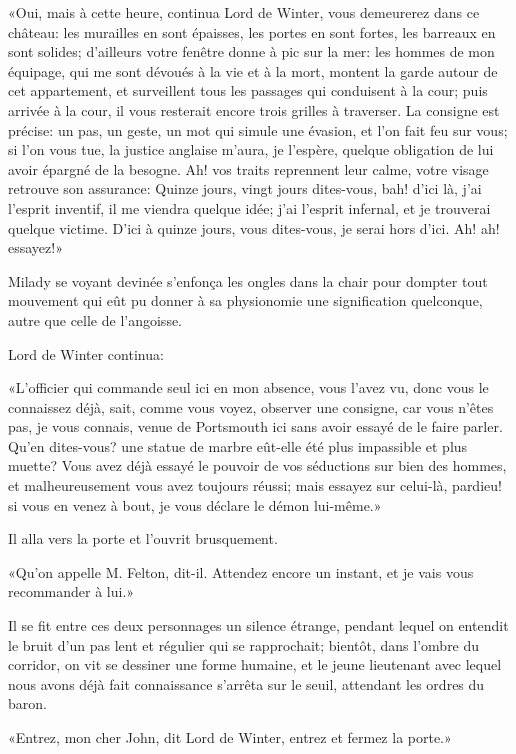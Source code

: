 «Oui, mais à cette heure, continua Lord de Winter, vous demeurerez dans ce château: les murailles en sont épaisses, les portes en sont fortes, les barreaux en sont solides; d'ailleurs votre fenêtre donne à pic sur la mer: les hommes de mon équipage, qui me sont dévoués à la vie et à la mort, montent la garde autour de cet appartement, et surveillent tous les passages qui conduisent à la cour; puis arrivée à la cour, il vous resterait encore trois grilles à traverser. La consigne est précise: un pas, un geste, un mot qui simule une évasion, et l'on fait feu sur vous; si l'on vous tue, la justice anglaise m'aura, je l'espère, quelque obligation de lui avoir épargné de la besogne. Ah! vos traits reprennent leur calme, votre visage retrouve son assurance: Quinze jours, vingt jours dites-vous, bah! d'ici là, j'ai l'esprit inventif, il me viendra quelque idée; j'ai l'esprit infernal, et je trouverai quelque victime. D'ici à quinze jours, vous dites-vous, je serai hors d'ici. Ah! ah! essayez!» 

Milady se voyant devinée s'enfonça les ongles dans la chair pour dompter tout mouvement qui eût pu donner à sa physionomie une signification quelconque, autre que celle de l'angoisse. 

Lord de Winter continua: 

«L'officier qui commande seul ici en mon absence, vous l'avez vu, donc vous le connaissez déjà, sait, comme vous voyez, observer une consigne, car vous n'êtes pas, je vous connais, venue de Portsmouth ici sans avoir essayé de le faire parler. Qu'en dites-vous? une statue de marbre eût-elle été plus impassible et plus muette? Vous avez déjà essayé le pouvoir de vos séductions sur bien des hommes, et malheureusement vous avez toujours réussi; mais essayez sur celui-là, pardieu! si vous en venez à bout, je vous déclare le démon lui-même.» 

Il alla vers la porte et l'ouvrit brusquement. 

«Qu'on appelle M. Felton, dit-il. Attendez encore un instant, et je vais vous recommander à lui.» 

Il se fit entre ces deux personnages un silence étrange, pendant lequel on entendit le bruit d'un pas lent et régulier qui se rapprochait; bientôt, dans l'ombre du corridor, on vit se dessiner une forme humaine, et le jeune lieutenant avec lequel nous avons déjà fait connaissance s'arrêta sur le seuil, attendant les ordres du baron. 

«Entrez, mon cher John, dit Lord de Winter, entrez et fermez la porte.» 

